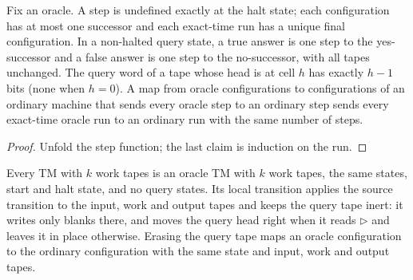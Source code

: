 \begin{lemma}
  \label{lem:barriers-oracle-deterministic}
  \leanok
  Fix an oracle. A step is undefined exactly at the halt state; each
  configuration has at most one successor and each exact-time run has a unique
  final configuration. In a non-halted query state, a true answer is one step
  to the yes-successor and a false answer is one step to the no-successor,
  with all tapes unchanged. The query word of a tape whose head is at cell $h$
  has exactly $h - 1$ bits (none when $h = 0$). A map from oracle
  configurations to configurations of an ordinary machine that sends every
  oracle step to an ordinary step sends every exact-time oracle run to an
  ordinary run with the same number of steps.
\end{lemma}
\begin{proof}
  \leanok
  Unfold the step function; the last claim is induction on the run.
\end{proof}

\begin{definition}
  \label{def:barriers-to-oracle}
  \leanok
  Every TM with $k$ work tapes is an oracle TM with $k$ work tapes, the same
  states, start and halt state, and no query states. Its local transition
  applies the source transition to the input, work and output tapes and keeps
  the query tape inert: it writes only blanks there, and moves the query head
  right when it reads $\triangleright$ and leaves it in place otherwise.
  Erasing the query tape maps an oracle configuration to the ordinary
  configuration with the same state and input, work and output tapes.
\end{definition}

